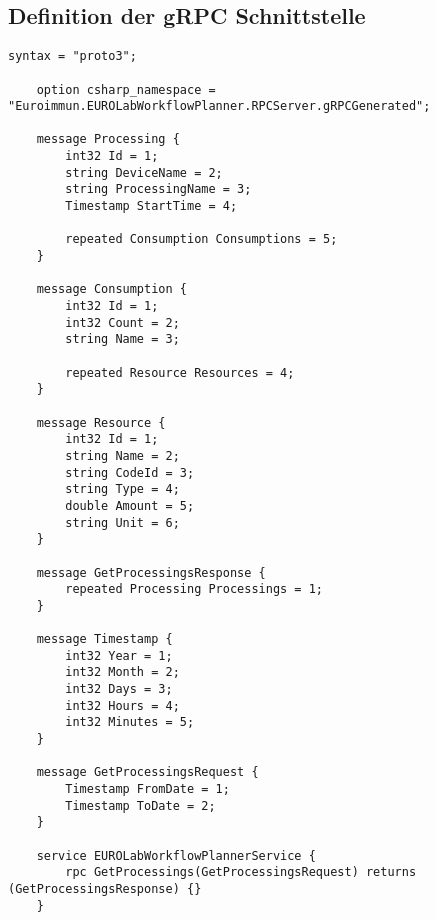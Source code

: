 \subsection{Definition der gRPC Schnittstelle}
\label{app:DefinitionSchnittstelle}

\lstset{language=protobuf2, style=protobuf}
\begin{lstlisting}[caption={Serverseitige Klasse}]
	syntax = "proto3";
	
	option csharp_namespace = "Euroimmun.EUROLabWorkflowPlanner.RPCServer.gRPCGenerated";
	
	message Processing {
		int32 Id = 1;
		string DeviceName = 2;
		string ProcessingName = 3;
		Timestamp StartTime = 4;
		
		repeated Consumption Consumptions = 5;
	}
	
	message Consumption {
		int32 Id = 1;
		int32 Count = 2;
		string Name = 3;
		
		repeated Resource Resources = 4;
	}
	
	message Resource {
		int32 Id = 1;
		string Name = 2;
		string CodeId = 3;
		string Type = 4;
		double Amount = 5;
		string Unit = 6;
	}
	
	message GetProcessingsResponse {
		repeated Processing Processings = 1;
	}
	
	message Timestamp {
		int32 Year = 1;
		int32 Month = 2;
		int32 Days = 3;
		int32 Hours = 4;
		int32 Minutes = 5;
	}
	
	message GetProcessingsRequest {
		Timestamp FromDate = 1;
		Timestamp ToDate = 2;
	}
	
	service EUROLabWorkflowPlannerService {
		rpc GetProcessings(GetProcessingsRequest) returns (GetProcessingsResponse) {}
	}
\end{lstlisting}
